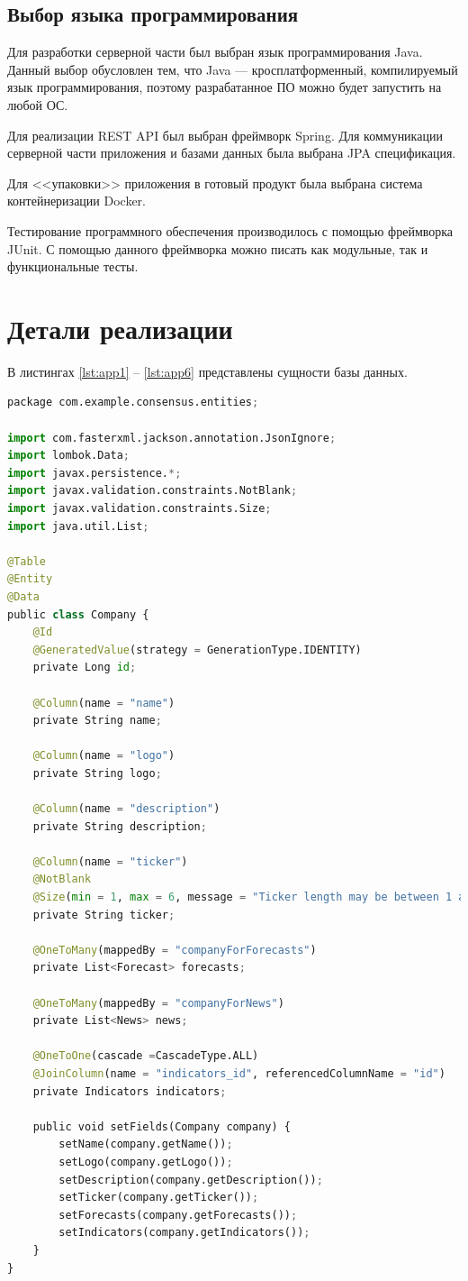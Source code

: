 \subsection{Выбор языка программирования}
Для разработки серверной части был выбран язык программирования Java. Данный выбор обусловлен тем, что Java --- кросплатформенный, компилируемый язык программирования, поэтому разрабатанное ПО можно будет запустить на любой ОС.  

Для реализации REST API был выбран фреймворк Spring. Для коммуникации  серверной части приложения и базами данных была выбрана JPA спецификация.   

Для <<упаковки>> приложения в готовый продукт была выбрана система контейнеризации Docker.  

Тестирование программного обеспечения производилось с помощью фреймворка JUnit. С помощью данного фреймворка можно писать как модульные, так и функциональные тесты.  


\section{Детали реализации}

В листингах \ref{lst:app1} -- \ref{lst:app6} представлены сущности базы данных.

\begin{lstlisting}[label=lst:app1, caption=Сущность Company, language=python]
package com.example.consensus.entities;

import com.fasterxml.jackson.annotation.JsonIgnore;
import lombok.Data;
import javax.persistence.*;
import javax.validation.constraints.NotBlank;
import javax.validation.constraints.Size;
import java.util.List;

@Table
@Entity
@Data
public class Company {
	@Id
	@GeneratedValue(strategy = GenerationType.IDENTITY)
	private Long id;

	@Column(name = "name")
	private String name;

	@Column(name = "logo")
	private String logo;

	@Column(name = "description")
	private String description;

	@Column(name = "ticker")
	@NotBlank
	@Size(min = 1, max = 6, message = "Ticker length may be between 1 and 6")
	private String ticker;

	@OneToMany(mappedBy = "companyForForecasts")
	private List<Forecast> forecasts;

	@OneToMany(mappedBy = "companyForNews")
	private List<News> news;

	@OneToOne(cascade =CascadeType.ALL)
	@JoinColumn(name = "indicators_id", referencedColumnName = "id")
	private Indicators indicators;

	public void setFields(Company company) {
		setName(company.getName());
		setLogo(company.getLogo());
		setDescription(company.getDescription());
		setTicker(company.getTicker());
		setForecasts(company.getForecasts());
		setIndicators(company.getIndicators());
	}
}	
\end{lstlisting}



